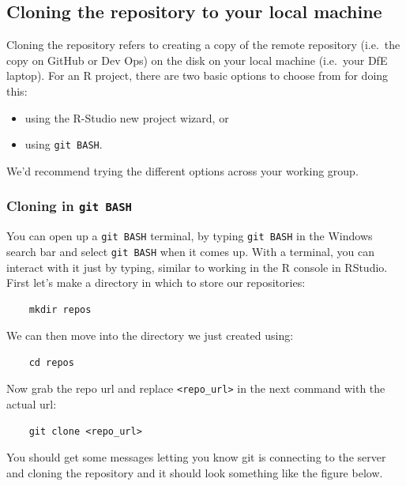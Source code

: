 \documentclass[
  12pt,
]{article}
\providecommand{\tightlist}{%
  \setlength{\itemsep}{0pt}\setlength{\parskip}{0pt}}
\begin{document}
\hypertarget{cloning-the-repository-to-your-local-machine}{%
\subsection{Cloning the repository to your local
machine}\label{cloning-the-repository-to-your-local-machine}}

Cloning the repository refers to creating a copy of the remote
repository (i.e.~the copy on GitHub or Dev Ops) on the disk on your
local machine (i.e.~your DfE laptop). For an R project, there are two
basic options to choose from for doing this:

\begin{itemize}
\tightlist
\item
  using the R-Studio new project wizard, or
\item
  using \texttt{git\ BASH}.
\end{itemize}

We'd recommend trying the different options across your working group.

\hypertarget{cloning-in-git-bash}{%
\subsubsection{\texorpdfstring{Cloning in
\texttt{git\ BASH}}{Cloning in git BASH}}\label{cloning-in-git-bash}}

You can open up a \texttt{git\ BASH} terminal, by typing
\texttt{git\ BASH} in the Windows search bar and select
\texttt{git\ BASH} when it comes up. With a terminal, you can interact
with it just by typing, similar to working in the R console in RStudio.
First let's make a directory in which to store our repositories:

\begin{verbatim}
    mkdir repos
\end{verbatim}

We can then move into the directory we just created using:

\begin{verbatim}
    cd repos
\end{verbatim}

Now grab the repo url and replace
\texttt{\textless{}repo\_url\textgreater{}} in the next command with the
actual url:

\begin{verbatim}
    git clone <repo_url>
\end{verbatim}

You should get some messages letting you know git is connecting to the
server and cloning the repository and it should look something like the
figure below.
\end{document}
